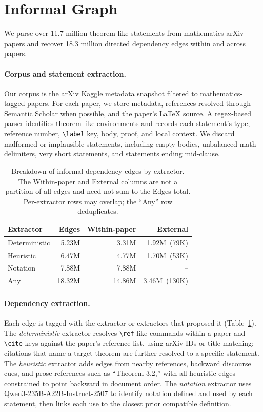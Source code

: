 \section{Informal Graph}

We parse over 11.7 million theorem-like statements from mathematics arXiv papers and recover 18.3 million directed dependency edges within and across papers.

\paragraph{Corpus and statement extraction.}
Our corpus is the arXiv Kaggle metadata snapshot filtered to mathematics-tagged papers. For each paper, we store metadata, references resolved through Semantic Scholar when possible, and the paper's \LaTeX{} source. A regex-based parser identifies theorem-like environments and records each statement's type, reference number, \verb|\label| key, body, proof, and local context. We discard malformed or implausible statements, including empty bodies, unbalanced math delimiters, very short statements, and statements ending mid-clause.

\begin{table}[ht]
  \centering
  \setlength{\tabcolsep}{4pt}
  \small
  \begin{tabular}{lrrr}
    \toprule
    \textbf{Extractor} & \textbf{Edges} & \textbf{Within-paper} & \textbf{External} \\
    \midrule
    Deterministic & 5.23M  & 3.31M  & 1.92M\ (79K) \\
    Heuristic     & 6.47M  & 4.77M  & 1.70M\ (53K) \\
    Notation      & 7.88M  & 7.88M  & -- \\
    \midrule
    Any           & 18.32M & 14.86M & 3.46M\ (130K) \\
    \bottomrule
  \end{tabular}
  \caption{Breakdown of informal dependency edges by extractor. The Within-paper and External columns are not a partition of all edges and need not sum to the Edges total. Per-extractor rows may overlap; the ``Any'' row deduplicates.
  }
  \label{tab:informal-edge-breakdown}
\end{table}

\paragraph{Dependency extraction.}
Each edge is tagged with the extractor or extractors that proposed it (Table~\ref{tab:informal-edge-breakdown}). The \emph{deterministic} extractor resolves \verb|\ref|-like commands within a paper and \verb|\cite| keys against the paper's reference list, using arXiv IDs or title matching; citations that name a target theorem are further resolved to a specific statement. The \emph{heuristic} extractor adds edges from nearby references, backward discourse cues, and prose references such as ``Theorem 3.2,'' with all heuristic edges constrained to point backward in document order. The \emph{notation} extractor uses Qwen3-235B-A22B-Instruct-2507 to identify notation defined and used by each statement, then links each use to the closest prior compatible definition.

